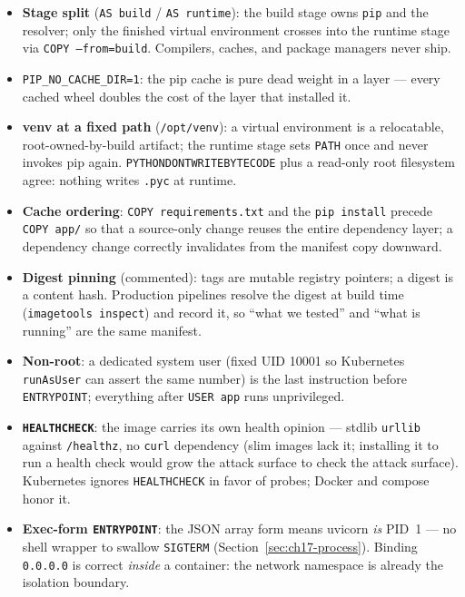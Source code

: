 \begin{itemize}
  \item \textbf{Stage split} (\texttt{AS build} / \texttt{AS runtime}):
        the build stage owns \texttt{pip} and the resolver; only the
        finished virtual environment crosses into the runtime stage via
        \texttt{COPY --from=build}. Compilers, caches, and package
        managers never ship.
  \item \texttt{PIP\_NO\_CACHE\_DIR=1}: the pip cache is pure dead weight
        in a layer --- every cached wheel doubles the cost of the layer
        that installed it.
  \item \textbf{venv at a fixed path} (\texttt{/opt/venv}): a virtual
        environment is a relocatable, root-owned-by-build artifact; the
        runtime stage sets \texttt{PATH} once and never invokes pip
        again. \texttt{PYTHONDONTWRITEBYTECODE} plus a read-only root
        filesystem agree: nothing writes \texttt{.pyc} at runtime.
  \item \textbf{Cache ordering}: \texttt{COPY requirements.txt} and the
        \texttt{pip install} precede \texttt{COPY app/} so that a
        source-only change reuses the entire dependency layer; a
        dependency change correctly invalidates from the manifest copy
        downward.
  \item \textbf{Digest pinning} (commented): tags are mutable registry
        pointers; a digest is a content hash. Production pipelines
        resolve the digest at build time (\texttt{imagetools inspect})
        and record it, so ``what we tested'' and ``what is running'' are
        the same manifest.
  \item \textbf{Non-root}: a dedicated system user (fixed UID 10001 so
        Kubernetes \texttt{runAsUser} can assert the same number) is the
        last instruction before \texttt{ENTRYPOINT}; everything after
        \texttt{USER app} runs unprivileged.
  \item \textbf{\texttt{HEALTHCHECK}}: the image carries its own health
        opinion --- stdlib \texttt{urllib} against \texttt{/healthz},
        no \texttt{curl} dependency (slim images lack it; installing it
        to run a health check would grow the attack surface to check the
        attack surface). Kubernetes ignores \texttt{HEALTHCHECK} in favor
        of probes; Docker and compose honor it.
  \item \textbf{Exec-form \texttt{ENTRYPOINT}}: the JSON array form means
        uvicorn \emph{is} PID~1 --- no shell wrapper to swallow
        \texttt{SIGTERM} (Section~\ref{sec:ch17-process}). Binding
        \texttt{0.0.0.0} is correct \emph{inside} a container: the
        network namespace is already the isolation boundary.
\end{itemize}

